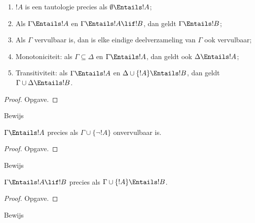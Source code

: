 \documentclass[../../../include/open-logic-section]{subfiles}
\begin{document}
\begin{prop}
\begin{enumerate} 
\item $!A$ is een tautologie precies als
  $\emptyset \Entails !A$; 
\item Als $\Gamma \Entails !A$ en $\Gamma \Entails !A \lif !B$, dan
  geldt $\Gamma \Entails !B$;
\item Als $\Gamma$ vervulbaar is, dan is elke eindige deelverzameling
  van $\Gamma$ ook vervulbaar; 
\item {} Monotoniciteit: als
  $\Gamma \subseteq \Delta$ en $\Gamma \Entails !A$, dan geldt ook
  $\Delta \Entails !A$;
\item {} Transitiviteit: als $\Gamma \Entails !A$ en
  $\Delta \cup \{ !A\} \Entails !B$, dan geldt
  $\Gamma \cup \Delta \Entails !B$.
\end{enumerate}
\end{prop}

\begin{proof}
Opgave.
\end{proof}

\begin{prob}
Bewijs 
\end{prob}

\begin{prop}
  $\Gamma \Entails !A$ precies als $\Gamma \cup \{\lnot !A\}$
  onvervulbaar is.
\end{prop}

\begin{proof}
Opgave.
\end{proof}

\begin{prob}
Bewijs 
\end{prob}

\begin{thm}
   $\Gamma \Entails !A \lif !B$ precies als
  $\Gamma \cup \{!A\} \Entails !B$.
\end{thm}

\begin{proof}
Opgave.
\end{proof}

\begin{prob}
Bewijs 
\end{prob}
\end{document}
